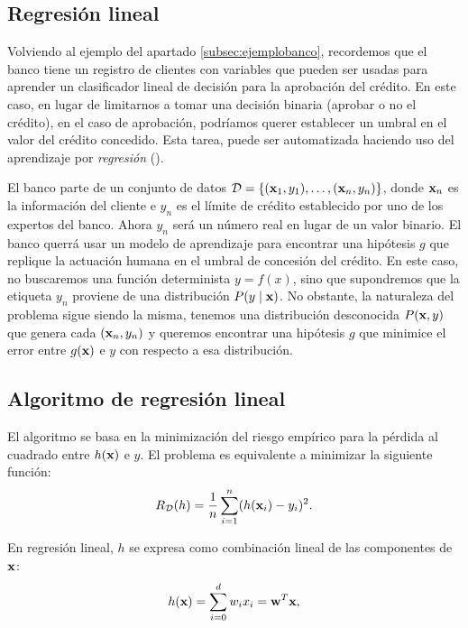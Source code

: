 \documentclass[oneside,openright,titlepage,numbers=noenddot,openany,headinclude,footinclude=true,
cleardoublepage=empty,abstractoff,BCOR=5mm,paper=a4,fontsize=12pt,main=spanish]{scrreprt}
\begin{document}
\subsection{Regresión lineal}

Volviendo al ejemplo del apartado \ref{subsec:ejemplobanco}, recordemos que el banco tiene un registro de clientes con variables que pueden ser usadas para aprender un clasificador lineal de decisión para la aprobación del crédito. En este caso, en lugar de limitarnos a tomar una decisión binaria (aprobar o no el crédito), en el caso de aprobación, podríamos querer establecer un umbral en el valor del crédito concedido. Esta tarea, puede ser automatizada haciendo uso del aprendizaje por \textit{regresión} (\cite{learning2012}). 

El banco parte de un conjunto de datos $\mathcal{D}=\{(\textbf{x}_1,y_1),\dots,(\textbf{x}_n,y_n)\}$, donde $\textbf{x}_n$ es la información del cliente e $y_n$ es el límite de crédito establecido por uno de los expertos del banco. Ahora $y_n$ será un número real en lugar de un valor binario. El banco querrá usar un modelo de aprendizaje para encontrar una hipótesis $g$ que replique la actuación humana en el umbral de concesión del crédito. En este caso, no buscaremos una función determinista $y = f(x)$, sino que supondremos que la etiqueta $y_n$ proviene de una distribución $P(y \mid \textbf{x})$. No obstante, la naturaleza del problema sigue siendo la misma, tenemos una distribución desconocida $P(\textbf{x}, y)$ que genera cada $(\textbf{x}_n, y_n)$ y queremos encontrar una hipótesis $g$ que minimice el error entre $g(\textbf{x})$ e $y$ con respecto a esa distribución.

\subsection*{Algoritmo de regresión lineal}

El algoritmo se basa en la minimización del riesgo empírico para la pérdida al cuadrado entre $h(\textbf{x})$ e $y$. El problema es equivalente a minimizar la siguiente función:
\begin{equation*}
    R_{\mathcal{D}}(h) = \frac{1}{n} \sum_{i=1}^n (h(\textbf{x}_i)-y_i)^2.
\end{equation*}

En regresión lineal, $h$ se expresa como combinación lineal de las componentes de $\textbf{x}$: 
\begin{equation*}
    h(\textbf{x})=\sum_{i=0}^d w_i x_i = \textbf{w}^T \textbf{x},
\end{equation*}
\end{document}

